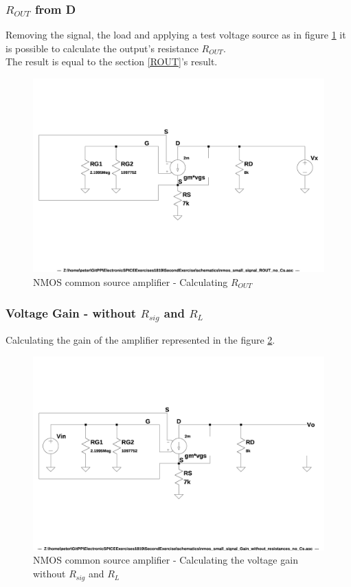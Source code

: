 \documentclass[10pt,a4paper]{book}
\begin{document}
\subsubsection{$R_{OUT}$ from D}

Removing the signal, the load and applying a test voltage source as in figure \ref{nmos_pi_ROUT_no_Cs} it is possible to calculate the output's resistance $R_{OUT}$.\\
The result is equal to the section \ref{ROUT}'s result.\par

\begin{figure}[h]
  \centering
  \includegraphics[width=12cm]{schematics/nmos_small_signal_ROUT_no_Cs.jpg}
  \caption{NMOS common source amplifier - Calculating $R_{OUT}$}
  \label{nmos_pi_ROUT_no_Cs}
\end{figure}

\subsubsection{Voltage Gain - without $R_{sig}$ and $R_L$}\label{AvSecNoCs}
Calculating the gain of the amplifier represented in the figure \ref{nmos_pi_gain_without_resistances_no_Cs}.

\begin{figure}[h]
  \centering
  \includegraphics[width=12cm]{schematics/nmos_small_signal_without_resistances_no_Cs.jpg}
  \caption{NMOS common source amplifier - Calculating the voltage gain without $R_{sig}$ and $R_L$}
  \label{nmos_pi_gain_without_resistances_no_Cs}
\end{figure}
\end{document}
